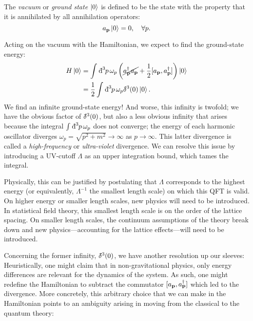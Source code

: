 \begin{definition}[vacuum]
  The \emph{vacuum} or \emph{ground state} $\ket{0}$ is defined to be the state with the property that it is annihilated by all annihilation operators:
  \begin{equation}
    a_{\vb{p}} \ket{0} = 0, \quad \forall p.
  \end{equation}
\end{definition}

Acting on the vacuum with the Hamiltonian, we expect to find the ground-state energy:
\begin{align}
  H \ket{0} &= \int_{}^{} \bdd[3]{p} \omega_p \left( \cancel{a^{\dagger}_{\vb{p}} a_{\vb{p}}} + \frac{1}{2} [a_{\vb{p}}, a^{\dagger}_{\vb{p}}] \right) \ket{0} \\
  &= \frac{1}{2}\int_{}^{} \bdd[3]{p} \omega_p \bdelta^3(0) \ket{0}.
\end{align}
We find an infinite ground-state energy!
And worse, this infinity is twofold; we have the obvious factor of $\bdelta^3(0)$, but also a less obvious infinity that arises because the integral $\int_{}^{} \bdd[3]{p} \omega_p$ does not converge; the energy of each harmonic oscillator diverges $\omega_{p} = \sqrt{p^2 + m^2} \rightarrow \infty$ as $p \to \infty$.
This latter divergence is called a \emph{high-frequency} or \emph{ultra-violet} divergence. We can resolve this issue by introducing a UV-cutoff $\Lambda$ as an upper integration bound, which tames the integral. 
\begin{leftbar}
  \begin{remark}
    Physically, this can be justified by postulating that $\Lambda$ corresponds to the highest energy (or equivalently, $\Lambda^{-1}$ the smallest length scale) on which this QFT is valid. On higher energy or smaller length scales, new physics will need to be introduced.
    In statistical field theory, this smallest length scale is on the order of the lattice spacing. On smaller length scales, the continuum assumptions of the theory break down and new physics---accounting for the lattice effects---will need to be introduced.
  \end{remark}
\end{leftbar}

Concerning the former infinity, $\bdelta^3(0)$, we have another resolution up our sleeves: Heuristically, one might claim that in non-gravitational physics, only energy differences are relevant for the dynamics of the system. As such, one might redefine the Hamiltonian to subtract the commutator $[a_{\vb{p}}, a^{\dagger}_{\vb{p}}]$ which led to the divergence.
More concretely, this arbitrary choice that we can make in the Hamiltonian points to an ambiguity arising in moving from the classical to the quantum theory:

